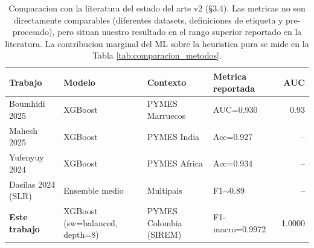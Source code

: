 \begin{table}[ht]
\centering
\small
\caption{Comparacion con la literatura del estado del arte v2 (\S3.4). Las metricas no son directamente comparables (diferentes datasets, definiciones de etiqueta y pre-procesado), pero situan nuestro resultado en el rango superior reportado en la literatura. La contribucion marginal del ML sobre la heuristica pura se mide en la Tabla \ref{tab:comparacion_metodos}.}
\label{tab:comparacion_literatura}
\begin{tabular}{l l l l r}
\toprule
Trabajo & Modelo & Contexto & Metrica reportada & AUC \\
\midrule
Boumhidi 2025 & XGBoost & PYMES Marruecos & AUC=0.930 & 0.93 \\
Mahesh 2025   & XGBoost & PYMES India     & Acc=0.927 & --   \\
Yufenyuy 2024 & XGBoost & PYMES Africa    & Acc=0.934 & --   \\
Dasilas 2024 (SLR) & Ensemble medio & Multipais & F1$\sim$0.89 & --   \\
\midrule
\textbf{Este trabajo} & XGBoost (sw=balanced, depth=8) & PYMES Colombia (SIREM) & F1-macro=0.9972 & 1.0000 \\
\bottomrule
\end{tabular}
\end{table}
